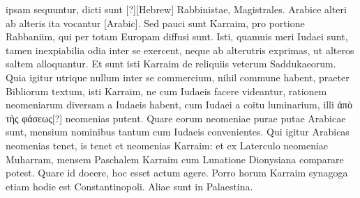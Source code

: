 ipsam sequuntur, dicti sunt \texthebrew{[?]}[Hebrew] Rabbinistae, Magistrales.
Arabice
alteri ab alteris ita vocantur \textarabic{}[Arabic].
Sed pauci sunt
Karraim, pro portione Rabbaniim, qui per totam Europam diffusi
sunt.
Isti, quamuis meri Iudaei sunt, tamen inexpiabilia odia inter
se exercent, neque ab alterutris exprimas, ut alteros saltem alloquantur.
%
Et sunt isti Karraim de reliquiis veterum Saddukaeorum.
Quia
igitur utrique nullum inter se commercium, nihil commune habent,
praeter Bibliorum textum, isti Karraim, ne cum Iudaeis facere
videantur, rationem neomeniarum diversam a Iudaeis habent, cum
Iudaei a coitu luminarium, illi \textgreek{ἀπὸ τὴς φάσεως[?]} neomenias putent.
Quare eorum neomeniae purae putae Arabicae sunt, mensium nominibus
tantum cum Iudaeis convenientes.
Qui igitur Arabicas neomenias
tenet, is tenet et neomenias Karraim: et ex Laterculo neomeniae
Muharram, mensem Paschalem Karraim cum Lunatione Dionysiana
comparare potest.
Quare id docere, hoc esset actum agere.
Porro horum Karraim synagoga etiam hodie est Constantinopoli.
Aliae sunt in Palaestina.
%
